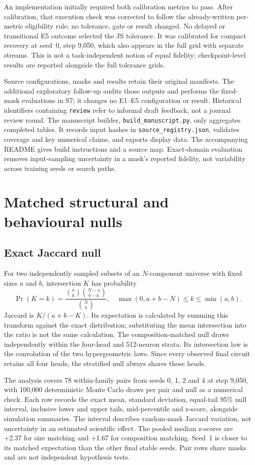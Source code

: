 \documentclass[10pt]{article}
\begin{document}
An implementation initially required both calibration metrics to pass. After calibration, that execution check was corrected to follow the already-written per-metric eligibility rule; no tolerance, gate or result changed. No delayed or transitional E5 outcome selected the JS tolerance. It was calibrated for compact recovery at seed~0, step 9,050, which also appears in the full grid with separate streams. This is not a task-independent notion of equal fidelity; checkpoint-level results are reported alongside the full tolerance grids.

Source configurations, masks and results retain their original manifests. The additional exploratory follow-up audits those outputs and performs the fixed-mask evaluations in S7; it changes no E1--E5 configuration or result. Historical identifiers containing \texttt{review} refer to informal draft feedback, not a journal review round. The manuscript builder, \texttt{build\_manuscript.py}, only aggregates completed tables. It records input hashes in \texttt{source\_registry.json}, validates coverage and key numerical claims, and exports display data. The accompanying README gives build instructions and a source map. Exact-domain evaluation removes input-sampling uncertainty in a mask's reported fidelity, not variability across training seeds or search paths.

\section{Matched structural and behavioural nulls}
\subsection{Exact Jaccard null}
For two independently sampled subsets of an $N$-component universe with fixed sizes $a$ and $b$, intersection $K$ has probability
\[
 \Pr(K=k)=\frac{\binom{a}{k}\binom{N-a}{b-k}}{\binom{N}{b}},
 \quad \max(0,a+b-N)\leq k\leq\min(a,b).
\]
Jaccard is $K/(a+b-K)$. Its expectation is calculated by summing this transform against the exact distribution; substituting the mean intersection into the ratio is not the same calculation. The composition-matched null draws independently within the four-head and 512-neuron strata. Its intersection law is the convolution of the two hypergeometric laws. Since every observed final circuit retains all four heads, the stratified null always shares those heads.

The analysis covers 78 within-family pairs from seeds 0, 1, 2 and 4 at step 9,050, with 100,000 deterministic Monte Carlo draws per pair and null as a numerical check. Each row records the exact mean, standard deviation, equal-tail 95\% null interval, inclusive lower and upper tails, mid-percentile and z-score, alongside simulation summaries. The interval describes random-mask Jaccard variation, not uncertainty in an estimated scientific effect. The pooled median z-scores are +2.37 for size matching and +1.67 for composition matching. Seed~1 is closer to its matched expectation than the other final stable seeds. Pair rows share masks and are not independent hypothesis tests.
\end{document}
